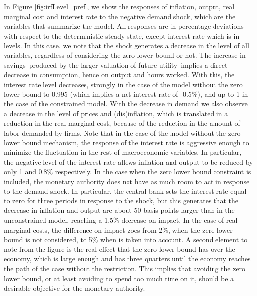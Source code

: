 \documentclass[11pt]{article}
\numberwithin{equation}{section}
\begin{document}
In Figure \ref{fig:irfLevel_pref}, we show the responses of inflation, output, real marginal cost and interest rate to the negative demand shock, which are the variables that summarize the model. All responses are in percentage deviations with respect to the deterministic steady state, except interest rate which is in levels. In this case, we note that the shock generates a decrease in the level of all variables, regardless of considering the zero lower bound or not. The increase in savings--produced by the larger valuation of future utility--implies a direct decrease in consumption, hence on output and hours worked. With this, the interest rate level decreases, strongly in the case of the model without the zero lower bound to 0.995 (which implies a net interest rate of -0.5\%), and up to 1 in the case of the constrained model. With the decrease in demand we also observe a decrease in the level of prices and (dis)inflation, which is translated in a reduction in the real marginal cost, because of the reduction in the amount of labor demanded by firms. Note that in the case of the model without the zero lower bound mechanism, the response of the interest rate is aggressive enough to minimize the fluctuation in the rest of macroeconomic variables. In particular, the negative level of the interest rate allows inflation and output to be reduced by only 1 and 0.8\% respectively. In the case when the zero lower bound constraint is included, the monetary authority does not have as much room to act in response to the demand shock. In particular, the central bank sets the interest rate equal to zero for three periods in response to the shock, but this generates that the decrease in inflation and output are about 50 basis points larger than in the unconstrained model, reaching a 1.5\% decrease on impact. In the case of real marginal costs, the difference on impact goes from 2\%, when the  zero lower bound is not considered, to 5\% when is taken into account. A second element to note from the figure is the real effect that the zero lower bound has over the economy, which is large enough and has three quarters until the economy reaches the path of the case without the restriction. This implies that avoiding the zero lower bound, or at least avoiding to spend too much time on it, should be a desirable objective for the monetary authority.
\end{document}
